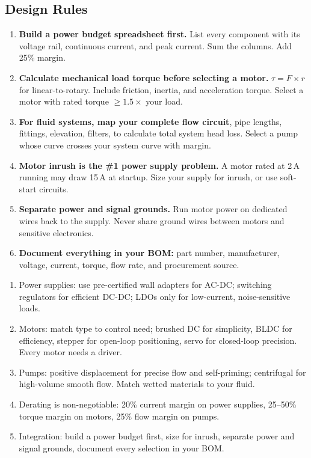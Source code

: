 \documentclass[11pt,letterpaper,twoside,openany]{book}
\begin{document}
\subsection{Design Rules}

\begin{enumerate}[leftmargin=1.5em]
  \item \textbf{Build a power budget spreadsheet first.} List every component with its voltage rail, continuous current, and peak current. Sum the columns. Add 25\% margin.
  \item \textbf{Calculate mechanical load torque before selecting a motor.} $\tau = F \times r$ for linear-to-rotary. Include friction, inertia, and acceleration torque. Select a motor with rated torque $\geq 1.5\times$ your load.
  \item \textbf{For fluid systems, map your complete flow circuit}, pipe lengths, fittings, elevation, filters, to calculate total system head loss. Select a pump whose curve crosses your system curve with margin.
  \item \textbf{Motor inrush is the \#1 power supply problem.} A motor rated at 2\,A running may draw 15\,A at startup. Size your supply for inrush, or use soft-start circuits.
  \item \textbf{Separate power and signal grounds.} Run motor power on dedicated wires back to the supply. Never share ground wires between motors and sensitive electronics.
  \item \textbf{Document everything in your BOM:} part number, manufacturer, voltage, current, torque, flow rate, and procurement source.
\end{enumerate}

\begin{keyconceptbox}
\begin{enumerate}[nosep,leftmargin=1.5em]
  \item Power supplies: use pre-certified wall adapters for AC-DC; switching regulators for efficient DC-DC; LDOs only for low-current, noise-sensitive loads.
  \item Motors: match type to control need; brushed DC for simplicity, BLDC for efficiency, stepper for open-loop positioning, servo for closed-loop precision. Every motor needs a driver.
  \item Pumps: positive displacement for precise flow and self-priming; centrifugal for high-volume smooth flow. Match wetted materials to your fluid.
  \item Derating is non-negotiable: 20\% current margin on power supplies, 25--50\% torque margin on motors, 25\% flow margin on pumps.
  \item Integration: build a power budget first, size for inrush, separate power and signal grounds, document every selection in your BOM.
\end{enumerate}
\end{keyconceptbox}
\end{document}
